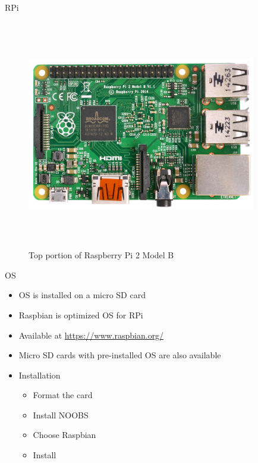 \begin{frame}{RPi}
	\begin{figure}
		\centering
		\includegraphics[width=10cm,height=10cm,keepaspectratio]{RPi2}
		\caption{Top portion of Raspberry Pi 2 Model B}
	\end{figure}
\end{frame}

\begin{frame}{OS}
	\begin{itemize}
		\item OS is installed on a micro SD card
		\item Raspbian is optimized OS for RPi
		\item Available at \url{https://www.raspbian.org/}
		\item Micro SD cards with pre-installed OS are also available
		\item Installation
		\begin{itemize}
			\item Format the card
			\item Install NOOBS
			\item Choose Raspbian
			\item Install
		\end{itemize} 
	\end{itemize}
\end{frame}

